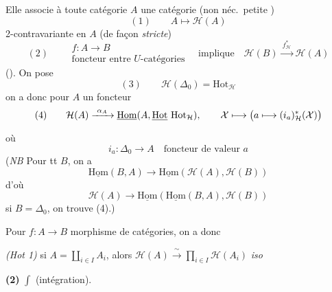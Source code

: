 \documentclass[11pt,a4paper]{article}
\begin{document}
Elle associe à toute \struck{\ill{}}  catégorie $A$
  une
catégorie (non néc.\ petite )
\[
  (1) \qquad \boxed{A \longmapsto \mathcal H(A)}
\]
  \struck{\ill{}} 2-contravariante
en $A$ (de façon \emph{stricte})
\[
  (2) \qquad
  \begin{array}{c} f : A \to B \\ \text{foncteur entre $U$-catégories}
  \end{array}
  \quad \text{implique} \quad
  \mathcal H(B) \xrightarrow{\ f^{*}_{\mathcal H}\ } \mathcal H(A)
\]
(\ill{}). On pose
\[
  (3) \qquad \mathcal H(\Delta_0) = \mathrm{Hot}_{\mathcal H}
\]
\ill{} \struck{\ill{}} on a donc pour $A$ un foncteur
\[
  (4) \qquad \mathcal H(A) \xrightarrow{\ \alpha_A\ }
  \underline{\mathrm{Hom}}(A, \struck{\mathrm{Hot}}\ \mathrm{Hot}_{\mathcal H}),
  \qquad
  \mathcal X \longmapsto \big(a \longmapsto (i_a)^{*}_{\mathcal H}(\mathcal X)\big)
\]
où
\[
  i_a : \Delta_0 \longrightarrow A \quad \text{foncteur de valeur } a
\]
(\emph{NB} Pour tt $B$, on a
\[
  \underline{\mathrm{Hom}}(B, A) \longrightarrow
  \underline{\mathrm{Hom}}(\mathcal H(A), \mathcal H(B))
\]
d'où
\[
  \mathcal H(A) \longrightarrow \underline{\mathrm{Hom}}(\underline{\mathrm{Hom}}(B, A),
  \mathcal H(B))
\]
si $B = \Delta_0$, on trouve (4).)

Pour $f : A \to B$ morphisme de catégories, on a donc




\emph{(Hot 1)} \quad si $A = \coprod_{i \in I} A_i$, alors
$\mathcal H(A) \xrightarrow{\ \sim\ } \prod_{i \in I} \mathcal H(A_i)$
\emph{iso}

\textbf{(2)} \quad $\int$ (intégration).
\end{document}
